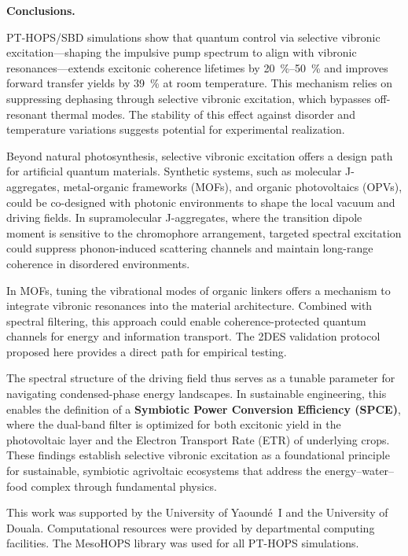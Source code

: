 \documentclass[journal=jpcl,manuscript=letter]{achemso}
\begin{document}
\textbf{Conclusions.}

PT-HOPS/SBD simulations show that quantum control via selective vibronic excitation---shaping the impulsive pump spectrum to align with vibronic resonances---extends excitonic coherence lifetimes by \SIrange{20}{50}{\percent} and improves forward transfer yields by \SI{39}{\percent} at room temperature. This mechanism relies on suppressing dephasing through selective vibronic excitation, which bypasses off-resonant thermal modes. The stability of this effect against disorder and temperature variations suggests potential for experimental realization.

Beyond natural photosynthesis, selective vibronic excitation offers a design path for artificial quantum materials. Synthetic systems, such as molecular J-aggregates, metal-organic frameworks (MOFs), and organic photovoltaics (OPVs), could be co-designed with photonic environments to shape the local vacuum and driving fields. In supramolecular J-aggregates, where the transition dipole moment is sensitive to the chromophore arrangement, targeted spectral excitation could suppress phonon-induced scattering channels and maintain long-range coherence in disordered environments.

In MOFs, tuning the vibrational modes of organic linkers offers a mechanism to integrate vibronic resonances into the material architecture. Combined with spectral filtering, this approach could enable coherence-protected quantum channels for energy and information transport. The 2DES validation protocol proposed here provides a direct path for empirical testing.

The spectral structure of the driving field thus serves as a tunable parameter for navigating condensed-phase energy landscapes. In sustainable engineering, this enables the definition of a \textbf{Symbiotic Power Conversion Efficiency (SPCE)}, where the dual-band filter is optimized for both excitonic yield in the photovoltaic layer and the Electron Transport Rate (ETR) of underlying crops. These findings establish selective vibronic excitation as a foundational principle for sustainable, symbiotic agrivoltaic ecosystems that address the energy--water--food complex through fundamental physics.


\begin{acknowledgement}
This work was supported by the University of Yaoundé~I and the University of Douala. Computational resources were provided by departmental computing facilities. The MesoHOPS library was used for all PT-HOPS simulations.
\end{acknowledgement}
\end{document}

